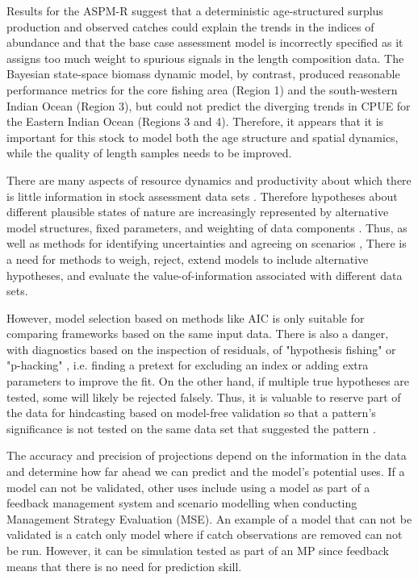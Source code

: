\documentclass[11pt,a4paper]{article}
\begin{document}
{Results for the ASPM-R suggest that a deterministic age-structured surplus production and observed catches could explain the trends in the indices of abundance and that the base case assessment model is incorrectly specified as it assigns too much weight to spurious signals in the length composition data. The Bayesian state-space biomass dynamic model, by contrast, produced reasonable performance metrics for the core fishing area (Region 1) and the south-western Indian Ocean (Region 3), but could not predict the diverging trends in CPUE for the Eastern Indian Ocean (Regions 3 and 4). Therefore, it appears that it is important for this stock to model both the age structure and spatial dynamics, while the quality of length samples needs to be improved. 

There are many aspects of resource dynamics and productivity about which there is little information in stock assessment data sets \citep[e.g.][]{lee2011m,lee2012steepness, jiao2012modelling,simon2012effects,mangel2013perspective,pepin2015reconsidering,cury2014resolving}. Therefore hypotheses about different plausible states of nature are increasingly represented by alternative model structures, fixed parameters, and weighting of data components \citep[][]{sharma2020trfmo}. Thus, as well as methods for identifying uncertainties and agreeing on scenarios \citep{leach2014elicit}, There is a need for methods to weigh, reject, extend models to include alternative hypotheses, and evaluate the value-of-information associated with different data sets. 

However, model selection based on methods like AIC is only suitable for comparing frameworks based on the same input data. There is also a danger, with diagnostics based on the inspection of residuals, of "hypothesis fishing" or "p-hacking" \citep{wasserstein2016asa,head2015extent}, i.e. finding a pretext for excluding an index or adding extra parameters to improve the fit. On the other hand, if multiple true hypotheses are tested, some will likely be rejected falsely. Thus, it is valuable to reserve part of the data for hindcasting based on model-free validation so that a pattern’s significance is not tested on the same data set that suggested the pattern \citep{arlot2010survey}.

The accuracy and precision of projections depend on the information in the data and determine how far ahead we can predict and the model's potential uses. If a model can not be validated, other uses include using a model as part of a feedback management system and scenario modelling when conducting Management Strategy Evaluation (MSE). An example of a model that can not be validated is a catch only model where if catch observations are removed can not be run. However, it can be simulation tested as part of an MP since feedback means that there is no need for prediction skill.


}
\end{document}
